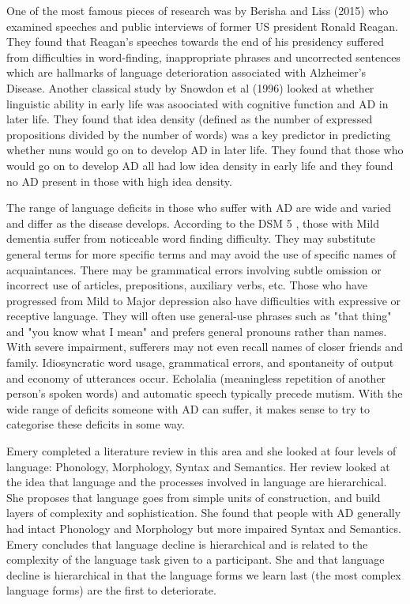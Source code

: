 \documentclass[a4paper]{article}
\begin{document}
\par
One of the most famous pieces of research was by Berisha and Liss (2015) \cite{Berisha2015} who examined speeches and public interviews of former US president Ronald Reagan. They found that Reagan's speeches towards the end of his presidency suffered from difficulties in word-finding, inappropriate phrases and uncorrected sentences which are hallmarks of language deterioration associated with Alzheimer's Disease. Another classical study by Snowdon et al (1996) \cite{Snowdon1996} looked at whether linguistic ability in early life was asoociated with cognitive function and AD in later life. They found that idea density (defined as the number of expressed propositions divided by the number of words) was a key predictor in predicting whether nuns would go on to develop AD in later life. They found that those who would go on to develop AD all had low idea density in early life and they found no AD present in those with high idea density. \newline
\par
The range of language deficits in those who suffer with AD are wide and varied and differ as the disease develops. According to the DSM 5 \cite{AmericanPsychiatricAssociation2013}, those with Mild dementia suffer from noticeable word finding difficulty. They may substitute general terms for more specific terms and may avoid the use of specific names of acquaintances. There may be grammatical errors involving subtle omission or incorrect use of articles, prepositions, auxiliary verbs, etc. Those who have progressed from Mild to Major depression also have difficulties with expressive or receptive language. They will often use general-use phrases such as "that thing" and "you know what I mean" and prefers general pronouns rather than names. With severe impairment, sufferers may not even recall names of closer friends and family. Idiosyncratic word usage, grammatical errors, and spontaneity of output and economy of utterances occur. Echolalia (meaningless repetition of another person's spoken words) and automatic speech typically precede mutism. With the wide range of deficits someone with AD can suffer, it makes sense to try to categorise these deficits in some way.\newline
\par
Emery \cite{Emery2000} completed a literature review in this area and she looked at four levels of language: Phonology, Morphology, Syntax and Semantics. Her review looked at the idea that language and the processes involved in language are hierarchical. She proposes that language goes from simple units of construction, and build layers of complexity and sophistication. She found that people with AD generally had intact Phonology and Morphology but more impaired Syntax and Semantics. Emery concludes that language decline is hierarchical and is related to the complexity of the language task given to a participant. She and that language decline is hierarchical in that the language forms we learn last (the most complex language forms) are the first to deteriorate.\newline
\end{document}
